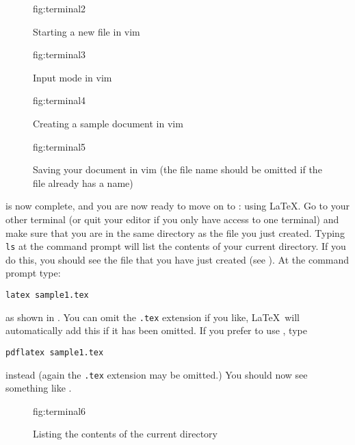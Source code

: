 \begin{figure}[htbp]
 {\caption{Starting a new file in vim}}
 {fig:terminal2}
\end{figure}

\begin{figure}[htbp]
  {\caption{Input mode in vim}}
  {fig:terminal3}
\end{figure}

\begin{figure}[htbp]
  {\caption{Creating a sample document in vim}}
  {fig:terminal4}
\end{figure}

\begin{figure}[htbp]
  {\caption{Saving your document in vim (the file name should be 
    omitted if the file already has a name)}}
  {fig:terminal5}
\end{figure}

 is now complete, and you are now ready to
move on to : using \LaTeX. Go to your
other terminal (or quit your editor if you only have access to one
terminal) and make sure that you are in the same directory as the
file you just created.  Typing \texttt{ls} at the command prompt will
list the contents of your current directory. If you do this, you
should see the file that you have just created (see
).  At the command prompt type:
\label{obj:termlatex}
\begin{verbatim}
latex sample1.tex
\end{verbatim}
as shown in . You can omit the \texttt{.tex}
extension if you like, \LaTeX\ will automatically add this if
it has been omitted. If you prefer to use \iPDFLaTeX, type
\begin{verbatim}
pdflatex sample1.tex
\end{verbatim}
instead (again the \texttt{.tex} extension may be omitted.)
You should now see something like .

\begin{figure}[htbp]
  {\caption{Listing the contents of the current directory}}
  {fig:terminal6}
\end{figure}

